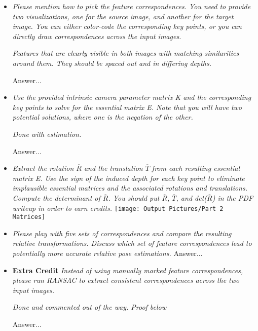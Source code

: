 \documentclass[11pt]{article}
\begin{document}
    \begin{itemize}
        \item \textit{Please mention how to pick the feature correspondences. You need to provide two visualizations,
            one for the source image, and another for the target image. You can either color-code the corresponding
            key points, or you can directly draw correspondences across the input images.}
        \par
        \textit{\textemdash Features that are clearly visible in both images with matching similarities around them.
        They should be spaced out and in differing depths.}
        \par
        Answer$\ldots$\newline

        \item \textit{Use the provided intrinsic camera parameter matrix K and the corresponding key points to solve
        for the essential matrix E. Note that you will have two potential solutions, where one is the negation of the
        other.}
        \par
        \textit{\textemdash Done with estimation.}
        \par
        Answer$\ldots$\newline

        \item \textit{Extract the rotation $\overline{R}$ and the translation $\overline{T}$ from each resulting
        essential matrix E. Use the sign of the induced depth for each key point to eliminate implausible essential
        matrices and the associated rotations and translations. Compute the determinant of $\overline{R}$. You should
        put $\overline{R}$, $\overline{T}$, and det($\overline{R}$) in
        the PDF writeup in order to earn credits.}\newline
        \texttt{[image: Output Pictures/Part 2 Matrices]}\newline

        \item \textit{Please play with five sets of correspondences and compare the resulting relative
        transformations. Discuss which set of feature correspondences lead to potentially more accurate relative pose
        estimations.}\newline
        Answer$\ldots$\newline

        \item \textbf{Extra Credit} \textit{Instead of using manually marked feature correspondences, please run
        RANSAC to extract consistent correspondences across the two input images.}
        \par
        \textit{\textemdash Done and commented out of the way. Proof below}
        \par
        Answer$\ldots$\newline
    \end{itemize}
\end{document}
